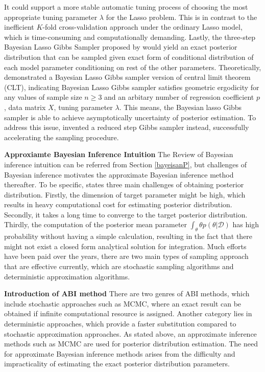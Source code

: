 It could support a more stable automatic tuning process of choosing the most appropriate tuning parameter $\lambda$ for the Lasso problem. This is in contrast to the inefficient $K$-fold cross-validation approach under the ordinary Lasso model, which is time-consuming and computationally demanding. Lastly, the three-step Bayesian Lasso Gibbs Sampler proposed by \cite{park_casella_2008} would yield an exact posterior distribution that can be sampled given exact form of conditional distribution of each model parameter conditioning on rest of the other parameters. Theoretically, \cite{khare_hobert_2013} demonstrated a Bayesian Lasso Gibbs sampler version of central limit theorem (CLT), indicating Bayesian Lasso Gibbs sampler satisfies geometric ergodicity for any values of sample size $n \geq 3$ and an arbitary number of regression coefficient $p$, data matrix $X$, tuning parameter $\lambda$. This means, the Bayesian lasso Gibbs sampler is able to achieve asymptotically uncertainty of posterior estimation. To address this issue, \cite{FastBL} invented a reduced step Gibbs sampler instead, successfully accelerating the sampling procedure. 

\textbf{Approxiamte Bayesian Inference Intuition}
The Review of Bayesian inference intuition can be referred from Section \ref{bayeisanP}, but challenges of Bayesian inference motivates the approximate Bayesian inference method thereafter. To be specific, \cite{bishop_2006} states three main challenges of obtaining posterior distribution. Firstly, the dimension of target parameter might be high, which results in heavy computational cost for estimating posterior distribution. Secondly, it takes a long time to converge to the target posterior distribution. Thirdly, the computation of the posterior mean parameter $\int_{\theta} \theta p(\theta|\mathcal{D})$ has high probability without having a simple calculation, resulting in the fact that there might not exist a closed form analytical solution for integration. Much efforts have been paid over the years, there are two main types of sampling approach that are effective currently, which are stochastic sampling algorithms and deterministic approximation algorithms. 

\textbf{Introduction of ABI method}
There are two genres of ABI methods, which include stochastic approaches such as MCMC, where an exact result can be obtained if infinite computational resource is assigned. Another category lies in deterministic approaches, which provide a faster substitution compared to stochastic approximation approaches.
As stated above, an approximate inference methods such as MCMC are used for posterior distribution estimation. The need for approximate Bayesian inference methods arises from the difficulty and impracticality of estimating the exact posterior distribution parameters.

